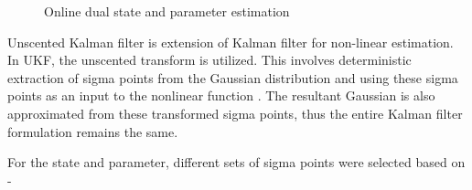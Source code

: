 \documentclass[12pt,titlepage]{article}
\begin{document}
\begin{figure}[h]
	\centering
	\caption{Online dual state and parameter estimation}
	\label{fig:Estimation_frame}
\end{figure}

Unscented Kalman filter is extension of Kalman filter for non-linear estimation. In UKF, the unscented transform is utilized. This involves deterministic extraction of sigma points from the Gaussian distribution and using these sigma points as an input to the nonlinear function \cite{wan}. The resultant Gaussian is also approximated from these transformed sigma points, thus the entire Kalman filter formulation remains the same. 

For the state and parameter, different sets of sigma points were selected based on - 
\end{document}
